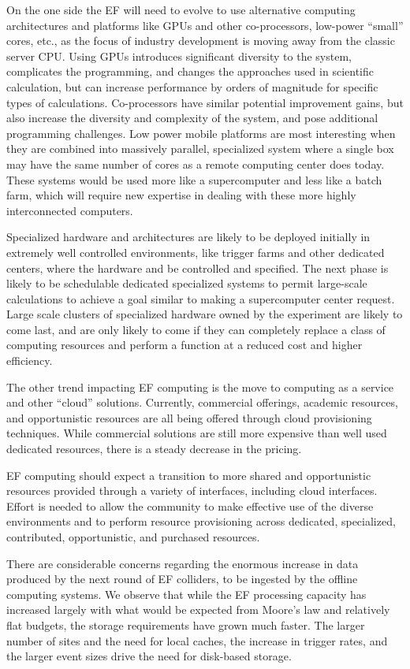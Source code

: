 On the one side the EF will need to evolve to use alternative computing
architectures and platforms like GPUs and other co-processors,  low-power
``small'' cores, etc., as the focus of industry development is moving away from
the classic server CPU.  Using GPUs introduces significant diversity to the
system, complicates the programming, and changes the approaches used in
scientific calculation, but can increase performance by orders of magnitude
for specific types of calculations.  Co-processors have similar potential
improvement gains, but also increase the diversity and complexity of the
system, and pose additional programming challenges.  Low power mobile
platforms are most interesting when they are combined into massively parallel,
specialized system where a single box may have the same number of cores as a
remote computing center does today.  These systems would be used more like a
supercomputer and less like a batch farm, which will require new
expertise in dealing with these more highly interconnected computers.

Specialized hardware and architectures are likely to be deployed initially in
extremely well controlled environments, like trigger farms and other dedicated
centers, where the hardware and be controlled and specified. The next phase is
likely to be schedulable dedicated specialized systems to permit large-scale
calculations to achieve a goal similar to making a supercomputer center
request.  Large scale clusters of specialized hardware owned by the experiment
are likely to come last, and are only likely to come if they can completely
replace a class of computing resources and perform a function at a reduced
cost and higher efficiency.

The other trend impacting EF computing is the move to computing as a service
and other ``cloud'' solutions.  Currently,  commercial offerings, academic
resources, and opportunistic resources are all being offered through cloud
provisioning techniques.  While commercial solutions are still more expensive
than well used dedicated resources, there is a steady decrease in the pricing.

EF computing should expect a transition to more shared and opportunistic
resources provided through a variety of interfaces, including cloud
interfaces.   Effort is needed to allow the community to make effective use of
the diverse environments and to perform resource provisioning across
dedicated, specialized, contributed, opportunistic, and purchased resources.

There are considerable concerns regarding the enormous increase in data
produced by the next round of EF colliders,   to be ingested by the offline
computing systems.  We observe that while the EF processing capacity has
increased largely with what would be expected from Moore's law and relatively
flat budgets, the storage requirements have grown much faster.  The larger
number of sites and the need for local caches, the increase in trigger rates,
and the larger event sizes drive the need for disk-based storage.

